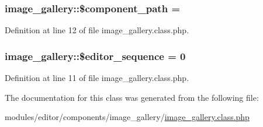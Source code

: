 \subsubsection[{\$component\+\_\+path}]{\setlength{\rightskip}{0pt plus 5cm}image\+\_\+gallery\+::\$component\+\_\+path = \textquotesingle{}\textquotesingle{}}\label{classimage__gallery_a1ace79c095079e133d5f98625d89460e}


Definition at line 12 of file image\+\_\+gallery.\+class.\+php.

\hypertarget{classimage__gallery_a63124b017697df694664efada4edd0be}{}
\subsubsection[{\$editor\+\_\+sequence}]{\setlength{\rightskip}{0pt plus 5cm}image\+\_\+gallery\+::\$editor\+\_\+sequence = 0}\label{classimage__gallery_a63124b017697df694664efada4edd0be}


Definition at line 11 of file image\+\_\+gallery.\+class.\+php.



The documentation for this class was generated from the following file\+:\begin{DoxyCompactItemize}
\item 
modules/editor/components/image\+\_\+gallery/\hyperlink{image__gallery_8class_8php}{image\+\_\+gallery.\+class.\+php}\end{DoxyCompactItemize}
